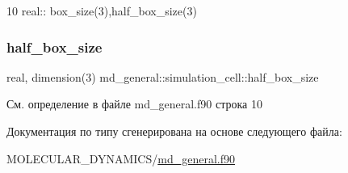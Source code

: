 \begin{DoxyCode}
10     \textcolor{keywordtype}{real}:: box\_size(3),half\_box\_size(3)
\end{DoxyCode}
\mbox{\label{structmd__general_1_1simulation__cell_a3326fd3cbb92be765ba432cfb7acb693}} 
\subsubsection{\texorpdfstring{half\+\_\+box\+\_\+size}{half\_box\_size}}
{\footnotesize\ttfamily real, dimension(3) md\+\_\+general\+::simulation\+\_\+cell\+::half\+\_\+box\+\_\+size}



См. определение в файле md\+\_\+general.\+f90 строка 10



Документация по типу сгенерирована на основе следующего файла\+:\begin{DoxyCompactItemize}
\item 
M\+O\+L\+E\+C\+U\+L\+A\+R\+\_\+\+D\+Y\+N\+A\+M\+I\+C\+S/\mbox{\hyperlink{md__general_8f90}{md\+\_\+general.\+f90}}\end{DoxyCompactItemize}
